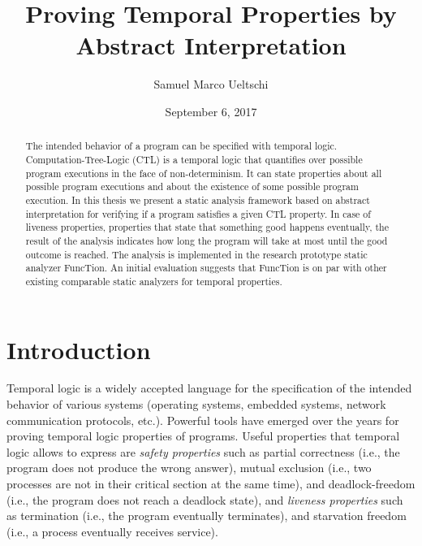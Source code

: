 \documentclass[11pt,a4paper,titlepage]{article}
\title{Proving Temporal Properties by Abstract Interpretation}
\date{September 6, 2017}
\author{Samuel Marco Ueltschi}
\theoremstyle{definition}
\begin{document}
\maketitle

\begin{abstract}
    The intended behavior of a program can be specified with temporal logic. Computation-Tree-Logic (CTL) is 
    a temporal logic that quantifies over possible program executions in the face of non-determinism. 
    It can state properties about all possible program executions and about the existence of some possible program execution.
    In this thesis we present a static analysis framework based on abstract interpretation for verifying if a program satisfies a given CTL property. 
    In case of liveness properties, properties that state that something good happens eventually, 
    the result of the analysis indicates how long the program will take at most until the good outcome is reached.
    The analysis is implemented in the research prototype static analyzer FuncTion. An initial evaluation suggests that FuncTion is on 
    par with other existing comparable static analyzers for temporal properties.
\end{abstract}



\tableofcontents
\clearpage

\section{Introduction}
 
Temporal logic is a widely accepted language for the specification of the intended behavior of various systems 
(operating systems, embedded systems, network communication protocols, etc.). 
Powerful tools have emerged over the years for proving temporal logic properties of programs.
Useful properties that temporal logic allows to express are \emph{safety properties} such as partial correctness (i.e., the program does not produce the wrong answer), 
mutual exclusion (i.e., two processes are not in their critical section at the same time), 
and deadlock-freedom (i.e., the program does not reach a deadlock state), 
and \emph{liveness properties} such as termination (i.e., the program eventually terminates), 
and starvation freedom (i.e., a process eventually receives service).\\
\end{document}
